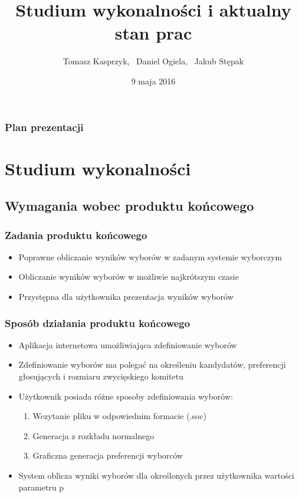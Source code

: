 \documentclass{beamer}
\title
[System obliczający wyniki wyborów]
{Studium wykonalności i aktualny stan prac}
\author
[T. Kasprzyk, D. Ogiela, J. Stępak]
{Tomasz Kasprzyk, \ Daniel Ogiela, \ Jakub Stępak}
\institute
[AGH]
{
Akademia Górniczo-Hutnicza

Wydział Informatyki, Elektroniki i Telekomunikacji

Katedra Informatyki 

}
\date{9 maja 2016}
\begin{document}
\frame{\titlepage}

\begin{frame}
\frametitle{Plan prezentacji}
\tableofcontents
\end{frame}


\section{Studium wykonalności}
\subsection{Wymagania wobec produktu końcowego}

\begin{frame}

\frametitle{Zadania produktu końcowego}
\begin{itemize}
\item Poprawne obliczanie wyników wyborów w zadanym systemie wyborczym
\item Obliczanie wyników wyborów w możliwie najkrótszym czasie
\item Przystępna dla użytkownika prezentacja wyników wyborów
\end{itemize}

\end{frame}

\begin{frame}

\frametitle{Sposób działania produktu końcowego}
\begin{itemize}
\item Aplikacja internetowa umożliwiająca zdefiniowanie wyborów
\item Zdefiniowanie wyborów ma polegać na określeniu kandydatów, preferencji głosujących i rozmiaru zwycięskiego komitetu
\item Użytkownik posiada różne sposoby zdefiniowania wyborów:
\begin{enumerate}
\item Wczytanie pliku w odpowiednim formacie (.soc)
\item Generacja z rozkładu normalnego
\item Graficzna generacja preferencji wyborców
\end{enumerate}
\item System oblicza wyniki wyborów dla określonych przez użytkownika wartości parametru p
\end{itemize}

\end{frame}
\end{document}
